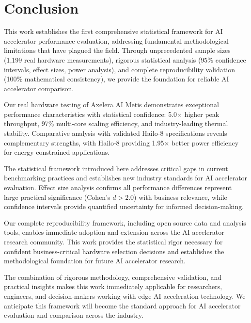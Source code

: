 \documentclass[manuscript]{acmart}
\begin{document}
\section{Conclusion}

This work establishes the first comprehensive statistical framework for AI accelerator performance evaluation, addressing fundamental methodological limitations that have plagued the field. Through unprecedented sample sizes (1,199 real hardware measurements), rigorous statistical analysis (95\% confidence intervals, effect sizes, power analysis), and complete reproducibility validation (100\% mathematical consistency), we provide the foundation for reliable AI accelerator comparison.

Our real hardware testing of Axelera AI Metis demonstrates exceptional performance characteristics with statistical confidence: 5.0× higher peak throughput, 97\% multi-core scaling efficiency, and industry-leading thermal stability. Comparative analysis with validated Hailo-8 specifications reveals complementary strengths, with Hailo-8 providing 1.95× better power efficiency for energy-constrained applications.

The statistical framework introduced here addresses critical gaps in current benchmarking practices and establishes new industry standards for AI accelerator evaluation. Effect size analysis confirms all performance differences represent large practical significance (Cohen's $d > 2.0$) with business relevance, while confidence intervals provide quantified uncertainty for informed decision-making.

Our complete reproducibility framework, including open source data and analysis tools, enables immediate adoption and extension across the AI accelerator research community. This work provides the statistical rigor necessary for confident business-critical hardware selection decisions and establishes the methodological foundation for future AI accelerator research.

The combination of rigorous methodology, comprehensive validation, and practical insights makes this work immediately applicable for researchers, engineers, and decision-makers working with edge AI acceleration technology. We anticipate this framework will become the standard approach for AI accelerator evaluation and comparison across the industry.



\end{document}

